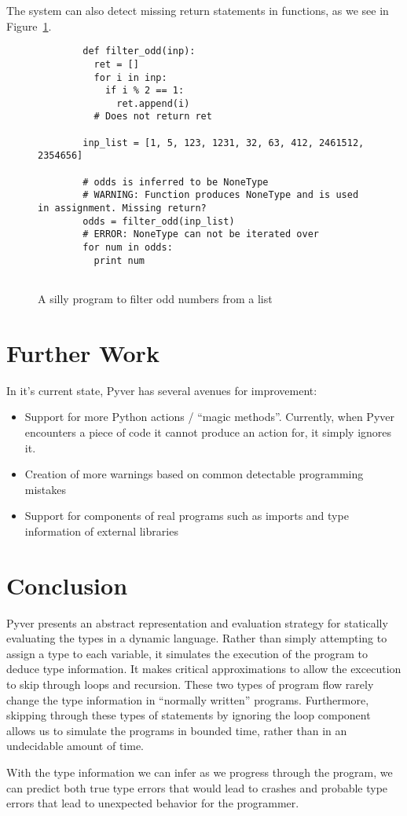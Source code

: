 \documentclass{article}[12pt]
\begin{document}
The system can also detect missing return statements in functions, as we see in
Figure~\ref{fig:noreturn}.
\begin{figure}
    \begin{verbatim}
        def filter_odd(inp):
          ret = []
          for i in inp:
            if i % 2 == 1:
              ret.append(i)
          # Does not return ret

        inp_list = [1, 5, 123, 1231, 32, 63, 412, 2461512, 2354656]

        # odds is inferred to be NoneType
        # WARNING: Function produces NoneType and is used in assignment. Missing return?
        odds = filter_odd(inp_list)
        # ERROR: NoneType can not be iterated over
        for num in odds:
          print num
    
    \end{verbatim}
    \caption{A silly program to filter odd numbers from a list}
    \label{fig:noreturn}
\end{figure}
\section{Further Work}

In it's current state, Pyver has several avenues for improvement: 
\begin{itemize}
      \item Support for more Python actions / ``magic methods''. Currently, when Pyver encounters a
          piece of code it cannot produce an action for, it simply ignores it.
      \item Creation of more warnings based on common detectable programming mistakes
      \item Support for components of real programs such as imports and type information of external
          libraries
\end{itemize}

\section{Conclusion}

Pyver presents an abstract representation and evaluation strategy for statically evaluating the
types in a dynamic language. Rather than simply attempting to assign a type to each variable, it
simulates the execution of the program to deduce type information. It makes critical approximations
to allow the excecution to skip through loops and recursion. These two types of program flow rarely
change the type information in ``normally written'' programs. Furthermore, skipping through these
types of statements by ignoring the loop component allows us to simulate the programs in bounded 
time, rather than in an undecidable amount of time.

With the type information we can infer as we progress through the program, we can predict both true
type errors that would lead to crashes and probable type errors that lead to unexpected behavior for
the programmer.
\end{document}
